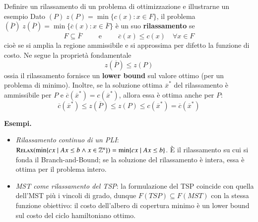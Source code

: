 \documentclass[12pt]{extarticle} %
\begin{document}
\begin{teoriabox}{Definire un rilassamento di un problema di ottimizzazione e illustrarne un esempio}
Dato $(P) \; z(P) = \min\{c(x) : x \in F\}$, il problema $(\overline{P}) \; z(\overline{P}) = \min\{\overline{c}(x) : x \in \overline{F}\}$ è un suo \textbf{rilassamento} se
\[
F \subseteq \overline{F} \hspace{1cm}\text{e}\hspace{1cm} \overline{c}(x) \le c(x) \quad \forall x \in F
\]
cioè se si amplia la regione ammissibile e si approssima per difetto la funzione di costo. Ne segue la proprietà fondamentale
\[
z(\overline{P}) \le z(P)
\]
ossia il rilassamento fornisce un \textbf{lower bound} sul valore ottimo (per un problema di minimo). Inoltre, se la soluzione ottima $\overline{x}^*$ del rilassamento è ammissibile per $P$ e $\overline{c}(\overline{x}^*) = c(\overline{x}^*)$, allora essa è ottima anche per $P$:
\[
\overline{c}(\overline{x}^*) \le z(\overline{P}) \le z(P) \le c(\overline{x}^*) = \overline{c}(\overline{x}^*)
\]

\noindent\textbf{Esempi.}
\begin{itemize}
    \item \textit{Rilassamento continuo di un PLI}: $\textsc{Relax}(\min\{cx \mid Ax\le b \wedge x \in \mathbb{Z}^n\}) = \min\{cx \mid Ax \le b\}$. È il rilassamento su cui si fonda il Branch-and-Bound; se la soluzione del rilassamento è intera, essa è ottima per il problema intero.
    \item \textit{MST come rilassamento del TSP}: la formulazione del TSP coincide con quella dell'MST più i vincoli di grado, dunque $F(TSP) \subseteq F(MST)$ con la stessa funzione obiettivo: il costo dell'albero di copertura minimo è un lower bound sul costo del ciclo hamiltoniano ottimo.
\end{itemize}
\end{teoriabox}
\end{document}
